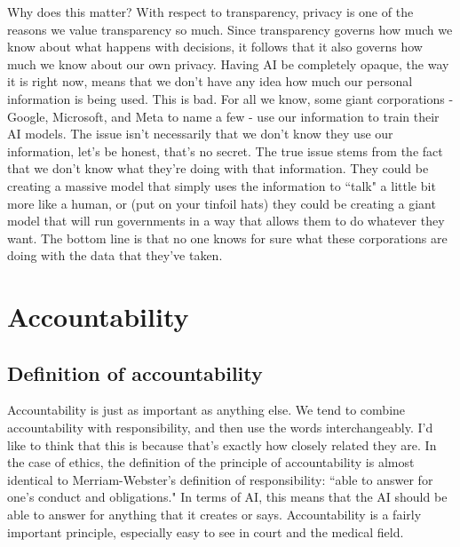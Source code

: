 \documentclass[12pt]{article}
\begin{document}
    Why does this matter? With respect to transparency, privacy is one of the reasons we value
    transparency so much. Since transparency governs how much we know about what happens with
    decisions, it follows that it also governs how much we know about our own privacy. Having AI
    be completely opaque, the way it is right now, means that we don't have any idea how much our
    personal information is being used. This is bad. For all we know, some giant corporations
    - Google, Microsoft, and Meta to name a few - use our information to train their AI models.
    The issue isn't necessarily that we don't know they use our information, let's be honest, 
    that's no secret. The true issue stems from the fact that we don't know what they're doing
    with that information. They could be creating a massive model that simply uses the information
    to ``talk" a little bit more like a human, or (put on your tinfoil hats) they could be creating
    a giant model that will run governments in a way that allows them to do whatever they want.
    The bottom line is that no one knows for sure what these corporations are doing with the data
    that they've taken.

    \section{Accountability}
    \subsection{Definition of accountability}
    Accountability is just as important as anything else. We tend to combine accountability with
    responsibility, and then use the words interchangeably. I'd like to think that this is because
    that's exactly how closely related they are. In the case of ethics, the definition of the principle
    of accountability is almost identical to Merriam-Webster's definition of responsibility: ``able to 
    answer for one's conduct and obligations." In terms of AI, this means that the AI should be
    able to answer for anything that it creates or says. Accountability is a fairly important principle,
    especially easy to see in court and the medical field.
\end{document}
